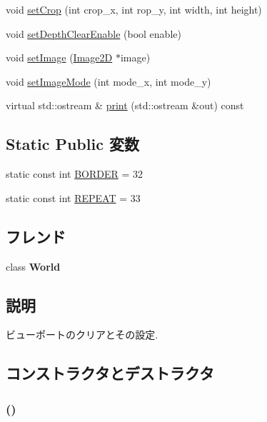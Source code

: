 \begin{CompactItemize}
\item 
void \hyperlink{classm3g_1_1Background_e543ac6196bbe65a7af8e6b8686441a7}{setCrop} (int crop\_\-x, int rop\_\-y, int width, int height)
\item 
void \hyperlink{classm3g_1_1Background_0953a713c22fd40cd586bcd8af80075a}{setDepthClearEnable} (bool enable)
\item 
void \hyperlink{classm3g_1_1Background_705b89b41cd1b38f664ed912be44baaa}{setImage} (\hyperlink{classm3g_1_1Image2D}{Image2D} $\ast$image)
\item 
void \hyperlink{classm3g_1_1Background_aba37cb460a2376f1a4722eebb4de9a9}{setImageMode} (int mode\_\-x, int mode\_\-y)
\item 
virtual std::ostream \& \hyperlink{classm3g_1_1Background_6fea17fa1532df3794f8cb39cb4f911f}{print} (std::ostream \&out) const 
\end{CompactItemize}
\subsection*{Static Public 変数}
\begin{CompactItemize}
\item 
static const int \hyperlink{classm3g_1_1Background_ee380e01b33e589c24984e4c4c1c6501}{BORDER} = 32
\item 
static const int \hyperlink{classm3g_1_1Background_a466d02b3d88f856854d0a0955be32e8}{REPEAT} = 33
\end{CompactItemize}
\subsection*{フレンド}
\begin{CompactItemize}
\item 
\hypertarget{classm3g_1_1Background_7b4bcdf992c21ae83363f25df05b1d25}{
class \textbf{World}}
\label{classm3g_1_1Background_7b4bcdf992c21ae83363f25df05b1d25}

\end{CompactItemize}


\subsection{説明}
ビューポートのクリアとその設定. 

\subsection{コンストラクタとデストラクタ}
\hypertarget{classm3g_1_1Background_2bbc220bb63956558a8603a7909c2bbd}{
\subsubsection[{Background}]{ ()}}
\label{classm3g_1_1Background_2bbc220bb63956558a8603a7909c2bbd}



